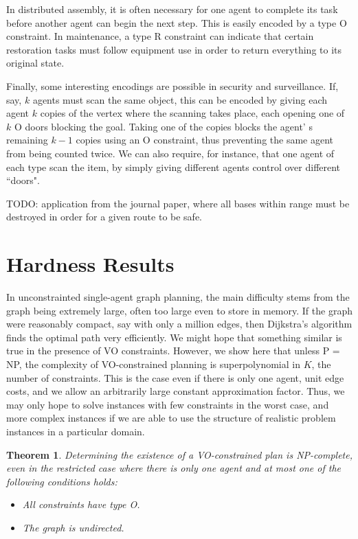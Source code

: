 \documentclass[letterpaper]{article}
\newtheorem{thm}{Theorem}
\begin{document}
In distributed assembly, it is often necessary for one agent to complete its task before another agent can begin the next step. This is easily encoded by a type O constraint. In maintenance, a type R constraint can indicate that certain restoration tasks must follow equipment use in order to return everything to its original state.

Finally, some interesting encodings are possible in security and surveillance. If, say, $k$ agents must scan the same object, this can be encoded by giving each agent $k$ copies of the vertex where the scanning takes place, each opening one of $k$ O doors blocking the goal. Taking one of the copies blocks the agent' s remaining $k-1$ copies using an O constraint, thus preventing the same agent from being counted twice. We can also require, for instance, that one agent of each type scan the item, by simply giving different agents control over different ``doors".

TODO: application from the journal paper, where all bases within range must be destroyed in order for a given route to be safe.


\section{Hardness Results}

In unconstrainted single-agent graph planning, the main difficulty stems from the graph being extremely large, often too large even to store in memory. If the graph were reasonably compact, say with only a million edges, then Dijkstra's algorithm finds the optimal path very efficiently. We might hope that something similar is true in the presence of VO constraints. However, we show here that unless P = NP, the complexity of VO-constrained planning is superpolynomial in $K$, the number of constraints. This is the case even if there is only one agent, unit edge costs, and we allow an arbitrarily large constant approximation factor. Thus, we may only hope to solve instances with few constraints in the worst case, and more complex instances if we are able to use the structure of realistic problem instances in a particular domain.

\begin{thm}
Determining the existence of a VO-constrained plan is NP-complete, even in the restricted case where there is only one agent and at most one of the following conditions holds:
\begin{itemize}
\item All constraints have type O.
\item The graph is undirected.
\end{itemize}
\end{thm}
\end{document}
